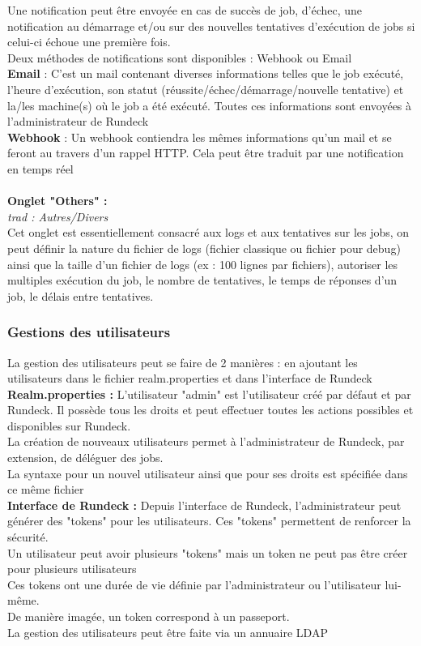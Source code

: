 \documentclass[12pt]{article}
\begin{document}
Une notification peut être envoyée en cas de succès de job, d'échec, une notification au démarrage et/ou sur des nouvelles tentatives d'exécution de jobs si celui-ci échoue une première fois.
\vspace{0.5cm}
\\
Deux méthodes de notifications sont disponibles : Webhook ou Email
\\
\textbf{Email} : C'est un mail contenant diverses informations telles que le job exécuté, l'heure d'exécution, son statut (réussite/échec/démarrage/nouvelle tentative) et la/les machine(s) où le job a été exécuté. Toutes ces informations sont envoyées à l'administrateur de Rundeck
\\
\textbf{Webhook} : Un webhook contiendra les mêmes informations qu'un mail et se feront au travers d'un rappel HTTP. Cela peut être traduit par une notification en temps réel 
\\
\vspace{0.2cm}
\\
\textbf{Onglet "Others" :}
\\
\textit{trad : Autres/Divers}
\\
Cet onglet est essentiellement consacré aux logs et aux tentatives sur les jobs, on peut définir la nature du fichier de logs (fichier classique ou fichier pour debug) ainsi que la taille d'un fichier de logs (ex : 100 lignes par fichiers), autoriser les multiples exécution du job, le nombre de tentatives, le temps de réponses d'un job, le délais entre tentatives.

\subsubsection{Gestions des utilisateurs}
La gestion des utilisateurs peut se faire de 2 manières : en ajoutant les utilisateurs dans le fichier realm.properties et dans l'interface de Rundeck
\\
\textbf{Realm.properties :}
L'utilisateur "admin" est l'utilisateur créé par défaut et par Rundeck. Il possède tous les droits et peut effectuer toutes les actions possibles et disponibles sur Rundeck.
\\
La création de nouveaux utilisateurs permet à l'administrateur de Rundeck, par extension, de déléguer des jobs.
\\
La syntaxe pour un nouvel utilisateur ainsi que pour ses droits est spécifiée dans ce même fichier
\\
\textbf{Interface de Rundeck :}
Depuis l'interface de Rundeck, l'administrateur peut générer des "tokens" pour les utilisateurs. Ces "tokens" permettent de renforcer la sécurité.
\\
Un utilisateur peut avoir plusieurs "tokens" mais un token ne peut pas être créer pour plusieurs utilisateurs
\\
Ces tokens ont une durée de vie définie par l'administrateur ou l'utilisateur lui-même.
\\
De manière imagée, un token correspond à un passeport.
\\
La gestion des utilisateurs peut être faite via un annuaire LDAP
\end{document}
